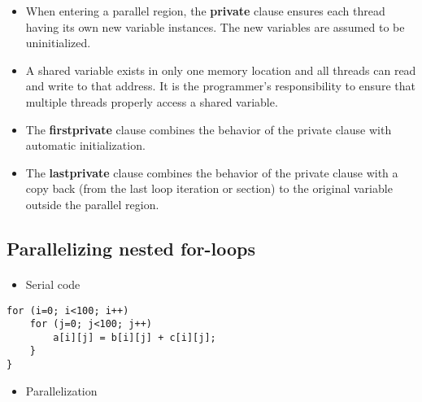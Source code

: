 \begin{itemize}
\item When entering a parallel region, the \textbf{private} clause ensures each thread having its own new variable instances. The new variables are assumed to be uninitialized.

\item A shared variable exists in only one memory location and all threads can read and write to that address. It is the programmer's responsibility to ensure that multiple threads properly access a shared variable.

\item The \textbf{firstprivate} clause combines the behavior of the private clause with automatic initialization.

\item The \textbf{lastprivate} clause combines the behavior of the private clause with a copy back (from the last loop iteration or section) to the original variable outside the parallel region.
\end{itemize}

\noindent



\subsection*{Parallelizing nested for-loops}

\paragraph{}

\begin{itemize}
 \item Serial code
\end{itemize}

\noindent






\begin{verbatim}
for (i=0; i<100; i++)
    for (j=0; j<100; j++)
        a[i][j] = b[i][j] + c[i][j];
    }
}

\end{verbatim}


\begin{itemize}
\item Parallelization
\end{itemize}

